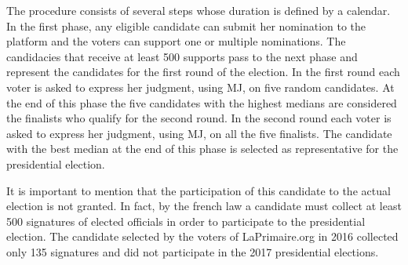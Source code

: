 The procedure consists of several steps whose duration is defined by a calendar. In the first phase, any eligible candidate can submit her nomination to the platform and the voters can support one or multiple nominations. The candidacies that receive at least 500 supports pass to the next phase and represent the candidates for the first round of the election. In the first round each voter is asked to express her judgment, using \ac{MJ}, on five random candidates. At the end of this phase the five candidates with the highest medians are considered the finalists who qualify for the second round. In the second round each voter is asked to express her judgment, using \ac{MJ}, on all the five finalists. The candidate with the best median at the end of this phase is selected as representative for the presidential election.

It is important to mention that the participation of this candidate to the actual election is not granted. In fact, by the french law a candidate must collect at least 500 signatures of elected officials in order to participate to the presidential election. The candidate selected by the voters of LaPrimaire.org in 2016 collected only 135 signatures and did not participate in the 2017 presidential elections.  

